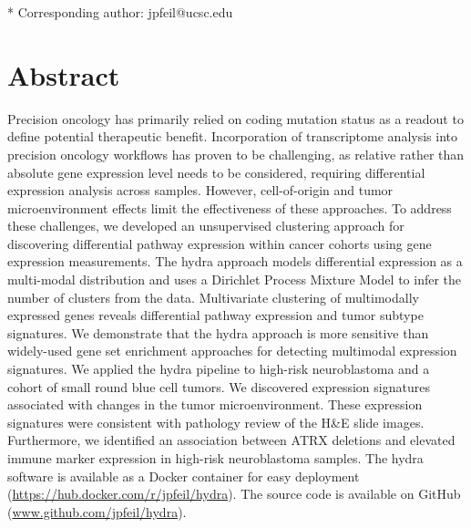 \documentclass[10pt,letterpaper]{article}
\begin{document}
\begin{flushleft}
% 
%





* Corresponding author: jpfeil@ucsc.edu

\end{flushleft}
\section*{Abstract}
Precision oncology has primarily relied on coding mutation status as a readout to define potential therapeutic benefit. Incorporation of transcriptome analysis into precision oncology workflows has proven to be challenging, as relative rather than absolute gene expression level needs to be considered, requiring differential expression analysis across samples. However, cell-of-origin and tumor microenvironment effects limit the effectiveness of these approaches. To address these challenges, we developed an unsupervised clustering approach for discovering differential pathway expression within cancer cohorts using gene expression measurements. The hydra approach models differential expression as a multi-modal distribution and uses a Dirichlet Process Mixture Model to infer the number of clusters from the data. Multivariate clustering of multimodally expressed genes reveals differential pathway expression and tumor subtype signatures. We demonstrate that the hydra approach is more sensitive than widely-used gene set enrichment approaches for detecting multimodal expression signatures. We applied the hydra pipeline to high-risk neuroblastoma and a cohort of small round blue cell tumors. We discovered expression signatures associated with changes in the tumor microenvironment. These expression signatures were consistent with pathology review of the H\&E slide images. Furthermore, we identified an association between ATRX deletions and elevated immune marker expression in high-risk neuroblastoma samples. The hydra software is available as a Docker container for easy deployment (\url{https://hub.docker.com/r/jpfeil/hydra}). The source code is available on GitHub (\url{www.github.com/jpfeil/hydra}).
\end{document}
